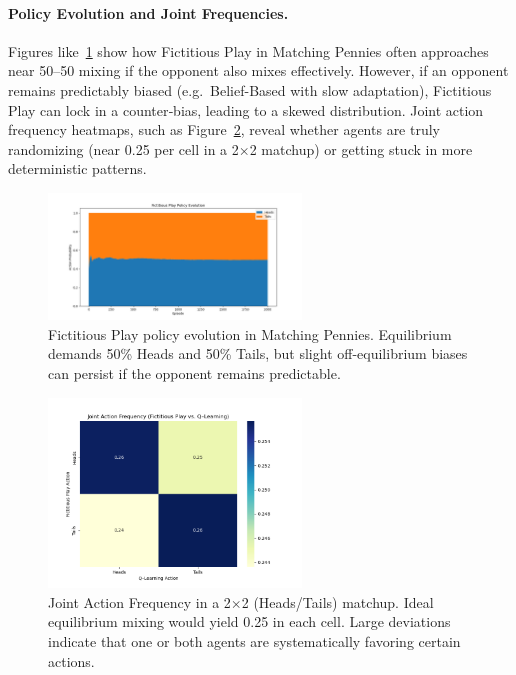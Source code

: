 \documentclass[11pt]{article}
\begin{document}
\paragraph{Policy Evolution and Joint Frequencies.}
Figures like~\ref{fig:mp-fp-policy} show how Fictitious Play in 
Matching Pennies often approaches near 50--50 mixing if the opponent also 
mixes effectively. However, if an opponent remains predictably biased 
(e.g.\ Belief-Based with slow adaptation), Fictitious Play can lock in a 
counter‐bias, leading to a skewed distribution. Joint action frequency 
heatmaps, such as Figure~\ref{fig:mp-joint-heatmap}, reveal whether 
agents are truly randomizing (near 0.25 per cell in a 2$\times$2 
matchup) or getting stuck in more deterministic patterns.

\begin{figure}[htbp]
    \centering
    \includegraphics[width=0.6\textwidth]{mp-plots/fp_vs_mm_fictitious_play_policy_evolution.png}
    \caption{Fictitious Play policy evolution in Matching Pennies. 
    Equilibrium demands 50\% Heads and 50\% Tails, but slight 
    off-equilibrium biases can persist if the opponent remains 
    predictable.}
    \label{fig:mp-fp-policy}
\end{figure}

\begin{figure}[htbp]
    \centering
    \includegraphics[width=0.6\textwidth]{mp-plots/fp_vs_ql_joint_actions.png}
    \caption{Joint Action Frequency in a 2$\times$2 (Heads/Tails) 
    matchup. Ideal equilibrium mixing would yield 0.25 in each cell. 
    Large deviations indicate that one or both agents are systematically 
    favoring certain actions.}
    \label{fig:mp-joint-heatmap}
\end{figure}
\end{document}
